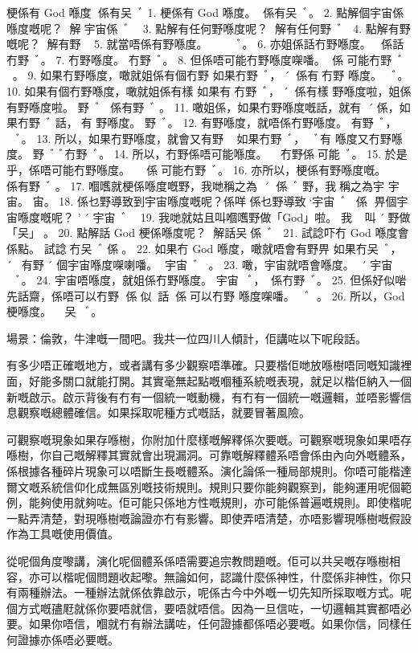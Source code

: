 梗係有 God 喺度
係有㕦ﾞ
1. 梗係有 God 喺度。 係有㕦ﾞ。
2. 點解個宇宙係喺度嘅呢？ 解宇宙係ﾞ？
3. 點解有任何野喺度呢？ 解有任何野ﾞ？
4. 點解有野嘅呢？ 解有野？
5. 就當唔係有野喺度。 𠄡係有野ﾞ。
6. 亦姐係話冇野喺度。 係話冇野ﾞ。
7. 冇野喺度。 冇野ﾞ。
8. 但係唔可能冇野喺度㗎噃。 係𠄡可能冇野ﾞ。
9. 如果冇野喺度，噉就姐係有個冇野
如果冇野ﾞ，´係有冇野
喺度。
ﾞ。
10. 如果有個冇野喺度，噉就姐係有樣
如果有冇野ﾞ，´係有樣
野喺度啦，姐係有野喺度啦。
野ﾞ，係有野ﾞ。
11. 噉姐係，如果冇野喺度嘅話，就有
´係，如果冇野ﾞ話，有
野喺度。
野ﾞ。
12. 有野喺度，就唔係冇野喺度。 有野ﾞ，𠄡係冇野ﾞ。
13. 所以，如果冇野喺度，就會又有野
，如果冇野ﾞ，ﾞ有
喺度又冇野喺度。
野ﾞﾞ冇野ﾞ。
14. 所以，冇野係唔可能喺度。 ，冇野係𠄡可能ﾞ。
15. 於是乎，係唔可能冇野喺度。 ，係𠄡可能冇野ﾞ。
16. 亦所以，梗係有野喺度嘅。 ，係有野ﾞ。
17. 嗰嚿就梗係喺度嘅野，我哋稱之為
´係ﾞ野，我稱之為宇
宇宙。
宙。
18. 係乜野導致到宇宙喺度嘅呢？係咩
係乜野導致`宇宙ﾞ？係
畀個宇宙喺度嘅呢？
'´宇宙ﾞ？
19. 我哋就姑且叫嗰嚿野做「God」啦。 我叫´野做「㕦」。
20. 點解話 God 梗係喺度呢？ 解話㕦係ﾞ？
21. 試諗吓冇 God 喺度會係點。 試諗冇㕦ﾞ係。
22. 如果冇 God 喺度，噉就唔會有野畀
如果冇㕦ﾞ，´𠄡有野´
個宇宙喺度㗎喇噃。
宇宙ﾞ。
23. 噉，宇宙就唔會喺度。 ´，宇宙𠄡ﾞ。
24. 宇宙唔喺度，就姐係冇野喺度。 宇宙𠄡ﾞ，係冇野ﾞ。
25. 但係好似啱先話齋，係唔可以冇野
係似話，係𠄡可以冇野
喺度㗎噃。
ﾞ。
26. 所以，God 梗喺度。 ，㕦ﾞ。




場景：倫敦，牛津嘅一間吧。我共一位四川人傾計，佢講咗以下呢段話。

有多少唔正確嘅地方，或者講有多少觀察唔準確。只要楷佢哋放喺樹唔同嘅知識裡面，好能多關口就能打開。其實毫無起點嘅嗰種系統嘅表現，就足以楷佢納入一個新嘅啟示。啟示背後有冇有一個統一嘅動機，有冇有一個統一嘅邏輯，並唔影響信息觀察嘅總體確信。如果採取呢種方式嘅話，就要冒著風險。

可觀察嘅現象如果存喺樹，你附加什麼樣嘅解釋係次要嘅。可觀察嘅現象如果唔存喺樹，你自己嘅解釋其實就會出現漏洞。可靠嘅解釋體系唔會係由內向外嘅體系，係根據各種碎片現象可以唔斷生長嘅體系。演化論係一種局部規則。你唔可能楷達爾文嘅系統信仰化成無區別嘅技術規則。規則只要你能夠觀察到，能夠運用呢個範例，能夠使用就夠咗。佢可能只係地方性嘅規則，亦可能係普遍嘅規則。即使楷呢一點弄清楚，對現喺樹嘅論證亦冇有影響。即使弄唔清楚，亦唔影響現喺樹嘅假設作為工具嘅使用價值。

從呢個角度嚟講，演化呢個體系係唔需要追宗教問題嘅。佢可以共㕦嘅存喺樹相容，亦可以楷呢個問題收起嚟。無論如何，認識什麼係神性，什麼係非神性，你只有兩種辦法。一種辦法就係依靠啟示，呢係古今中外嘅一切先知所採取嘅方式。呢個方式嘅孻屘就係你要唔就信，要唔就唔信。因為一旦信咗，一切邏輯其實都唔必要。如果你唔信，嗰就冇有辦法講咗，任何證據都係唔必要嘅。如果你信，同樣任何證據亦係唔必要嘅。

